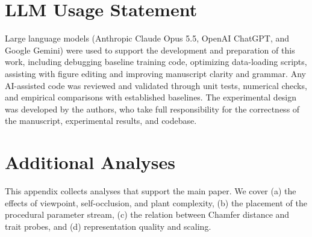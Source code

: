 \documentclass[10pt,twocolumn,letterpaper]{article}
\begin{document}
\clearpage %


\section*{LLM Usage Statement}
Large language models (Anthropic Claude Opus 5.5, OpenAI ChatGPT, and Google Gemini) were used to support the development and preparation of this work, including debugging baseline training code, optimizing data-loading scripts, assisting with figure editing and improving manuscript clarity and grammar. Any AI-assisted code was reviewed and validated through unit tests, numerical checks, and empirical comparisons with established baselines. The experimental design was developed by the authors, who take full responsibility for the correctness of the manuscript, experimental results, and codebase.

{
\small


}

\appendix
\maketitlesupplementary %
\setcounter{figure}{0}
\setcounter{table}{0}
\renewcommand{\thefigure}{S\arabic{figure}}
\renewcommand{\thetable}{S\arabic{table}}
\renewcommand{\theHfigure}{S\arabic{figure}}%
\renewcommand{\theHtable}{S\arabic{table}}
\makeatletter
\setlength{\@fptop}{0pt}\setlength{\@fpbot}{0pt plus 1fil}
\setlength{\@dblfptop}{0pt}\setlength{\@dblfpbot}{0pt plus 1fil}
\makeatother

\section{Additional Analyses}
\label{app:analyses}

This appendix collects analyses that support the main paper. We cover (a) the effects of viewpoint, self-occlusion, and plant complexity, (b) the placement of the procedural parameter stream, (c) the relation between Chamfer distance and trait probes, and (d) representation quality and scaling.
\end{document}

